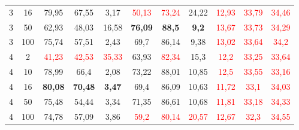 \begin{table}[ht]
\begin{tabular}{cc|ccc|ccc|ccc}
        {3}                           & {16}   & {79,95}                             & {67,55}                             & {3,17}                                   & \textcolor{red}{50,13} & \textcolor{red}{73,24} & {24,22}                & \textcolor{red}{12,93} & \textcolor{red}{33,79} & \textcolor{red}{34,46} \\
        {3}                           & {50}   & {62,93}                             & {48,03}                             & {16,58}                                  & {\textbf{76,09}}       & {\textbf{88,5}}        & \textbf{9,2}           & \textcolor{red}{13,67} & \textcolor{red}{33,73} & \textcolor{red}{34,29} \\
        {3}                           & {100}  & {75,74}                             & {57,51}                             & {2,43}                                   & {69,7}                 & {86,14}                & {9,38}                 & \textcolor{red}{13,02} & \textcolor{red}{33,64} & \textcolor{red}{34,2}  \\
        {4}                           & {2}    & \textcolor{red}{41,23}              & \textcolor{red}{42,53}              & \textcolor{red}{35,33}                   & {63,93}                & \textcolor{red}{82,34} & {15,3}                 & \textcolor{red}{12,2}  & \textcolor{red}{33,25} & \textcolor{red}{33,64} \\
        {4}                           & {10}   & {78,99}                             & {66,4}                              & {2,08}                                   & {73,22}                & {88,01}                & {10,85}                & \textcolor{red}{12,5}  & \textcolor{red}{33,55} & \textcolor{red}{33,16} \\
        {4}                           & {16}   & {\textbf{80,08}}                    & {\textbf{70,48}}                    & {\textbf{3,47}}                          & {69,4}                 & {86,09}                & {10,63}                & \textcolor{red}{11,72} & \textcolor{red}{33,1}  & \textcolor{red}{34,03} \\
        {4}                           & {50}   & {75,48}                             & {54,44}                             & {3,34}                                   & {71,35}                & {86,61}                & {10,68}                & \textcolor{red}{11,81} & \textcolor{red}{33,18} & \textcolor{red}{34,33} \\
        {4}                           & {100}  & {74,78}                             & {57,09}                             & {3,86}                                   & \textcolor{red}{59,2}  & \textcolor{red}{80,14} & \textcolor{red}{20,57} & \textcolor{red}{12,67} & \textcolor{red}{32,3}  & \textcolor{red}{34,55} \\

\end{tabular}
\end{table}
